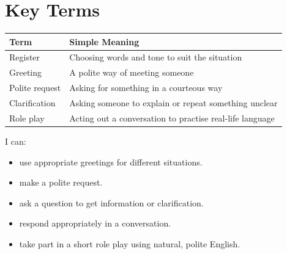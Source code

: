 \section{Key Terms}
\begin{table}[h!]
\centering
\begin{tabular}{|l|l|}
\hline
\textbf{Term} & \textbf{Simple Meaning} \\
\hline
Register & Choosing words and tone to suit the situation \\
Greeting & A polite way of meeting someone \\
Polite request & Asking for something in a courteous way \\
Clarification & Asking someone to explain or repeat something unclear \\
Role play & Acting out a conversation to practise real-life language \\
\hline
\end{tabular}
\end{table}

\begin{selfcheck}
I can:
\begin{itemize}
    \item use appropriate greetings for different situations.
    \item make a polite request.
    \item ask a question to get information or clarification.
    \item respond appropriately in a conversation.
    \item take part in a short role play using natural, polite English.
\end{itemize}
\end{selfcheck}